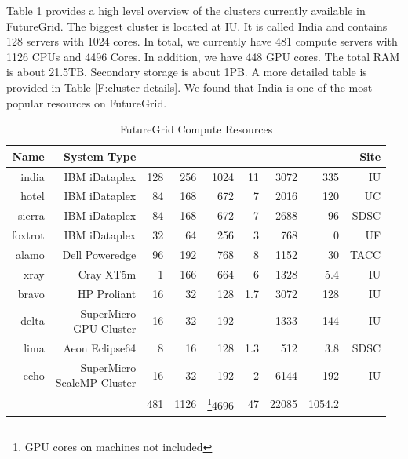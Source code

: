 \documentclass[graybox]{svmult}
\newcommand*\rot{\rotatebox{90}}
\begin{document}
Table \ref{T:hw} provides a high level overview of the clusters currently available in FutureGrid.  The biggest cluster is located at IU. It is called India and contains 128 servers with 1024 cores. In total, we currently have 481 compute servers with 1126 CPUs and 4496 Cores. In addition, we have 448 GPU cores. The total RAM is about 21.5TB. Secondary storage is about 1PB. A more detailed table is provided in Table \ref{F:cluster-details}. We found that India is one of the most popular resources on FutureGrid.

\begin{table}[htb]

\caption{FutureGrid Compute Resources}\label{T:hw}

\begin{center}
\begin{tabular}{rrrrrrrrr}
Name    & System Type                &  \rot{Nodes} &  \rot{CPUS}   & \rot{Cores}   & \rot{TFLOPS}  & \rot{RAM (GB)}        & \rot{Storage (TB)}    & Site \\
\hline
india   & IBM iDataplex              & 128          & 256     & 1024    & 11      & 3072            & 335             & IU \\
hotel   & IBM iDataplex              & 84           & 168     & 672     & 7       & 2016            & 120             & UC \\
sierra  & IBM iDataplex              & 84           & 168     & 672     & 7       & 2688            & 96              & SDSC \\
foxtrot & IBM iDataplex              & 32           & 64      & 256     & 3       & 768             & 0               & UF \\
alamo   & Dell Poweredge             & 96           & 192     & 768     & 8       & 1152            & 30              & TACC \\
xray    & Cray XT5m                  & 1            & 166     & 664     & 6       & 1328            & 5.4             & IU \\
bravo   & HP Proliant                & 16           & 32      & 128     & 1.7     & 3072            & 128             & IU \\
delta   & \shortstack{SuperMicro\\ GPU Cluster}     & 16           & 32      & 192     &         & 1333            & 144             & IU \\
lima    & Aeon Eclipse64             & 8            & 16      & 128     & 1.3     & 512             & 3.8             & SDSC \\
echo    & \shortstack{SuperMicro \\ScaleMP Cluster} & 16           & 32      & 192     & 2       & 6144            & 192             & IU \\
\hline
&& 481 & 1126 & \footnote{GPU cores on machines not included}4696 & 47 & 22085 & 1054.2 \\
\end{tabular}
\end{center}
\end{table}
\end{document}
